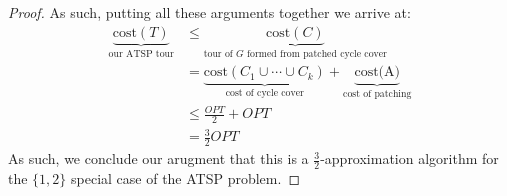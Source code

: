 \documentclass[12pt]{exam}
\begin{document}
\begin{questions}
\begin{solution}
\begin{enumerate}[label=(\alph*)]
\begin{proof}
        As such, putting all these arguments together we arrive at:
        \begin{align*}
          \underbrace{\text{cost}(T)}_{\text{our ATSP tour}} &\leq \underbrace{\text{cost}(C)}_{\text{tour of $G$ formed from patched cycle cover}} \tag{By triangle inequality due to shortcutting} \\
          &= \underbrace{\text{cost}(C_1 \cup \cdots \cup C_k)}_{\text{cost of cycle cover}} + \underbrace{\text{cost(A)}}_{\text{cost of patching}} \tag{By construction} \\
          &\leq \frac{OPT}{2} + OPT \tag{As argued above} \\
          &= \frac{3}{2}OPT
        \end{align*}
        As such, we conclude our arugment that this is a $\frac{3}{2}$-approximation algorithm for the $\{1,2\}$ special case of the ATSP problem.
      \end{proof}
  \end{enumerate} 
\end{solution}

\end{questions}
\end{document}
